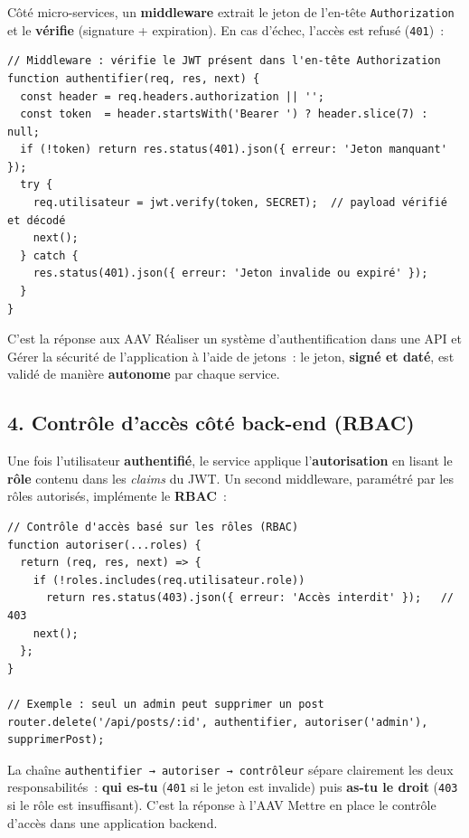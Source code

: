 \noindent Côté micro-services, un \textbf{middleware} extrait le jeton de l'en-tête \texttt{Authorization} et le \textbf{vérifie} (signature + expiration). En cas d'échec, l'accès est refusé (\texttt{401})~:

\begin{verbatim}
// Middleware : vérifie le JWT présent dans l'en-tête Authorization
function authentifier(req, res, next) {
  const header = req.headers.authorization || '';
  const token  = header.startsWith('Bearer ') ? header.slice(7) : null;
  if (!token) return res.status(401).json({ erreur: 'Jeton manquant' });
  try {
    req.utilisateur = jwt.verify(token, SECRET);  // payload vérifié et décodé
    next();
  } catch {
    res.status(401).json({ erreur: 'Jeton invalide ou expiré' });
  }
}
\end{verbatim}

\noindent C'est la réponse aux AAV \og{}Réaliser un système d'authentification dans une API\fg{} et \og{}Gérer la sécurité de l'application à l'aide de jetons\fg{}~: le jeton, \textbf{signé et daté}, est validé de manière \textbf{autonome} par chaque service.

\newpage

\subsection*{4. Contrôle d'accès côté back-end (RBAC)}
{}
\noindent Une fois l'utilisateur \textbf{authentifié}, le service applique l'\textbf{autorisation} en lisant le \textbf{rôle} contenu dans les \textit{claims} du JWT. Un second middleware, paramétré par les rôles autorisés, implémente le \textbf{RBAC}~:

\begin{verbatim}
// Contrôle d'accès basé sur les rôles (RBAC)
function autoriser(...roles) {
  return (req, res, next) => {
    if (!roles.includes(req.utilisateur.role))
      return res.status(403).json({ erreur: 'Accès interdit' });   // 403
    next();
  };
}

// Exemple : seul un admin peut supprimer un post
router.delete('/api/posts/:id', authentifier, autoriser('admin'), supprimerPost);
\end{verbatim}

\noindent La chaîne \texttt{authentifier → autoriser → contrôleur} sépare clairement les deux responsabilités~: \textbf{qui es-tu} (\texttt{401} si le jeton est invalide) puis \textbf{as-tu le droit} (\texttt{403} si le rôle est insuffisant). C'est la réponse à l'AAV \og{}Mettre en place le contrôle d'accès dans une application backend\fg{}.

